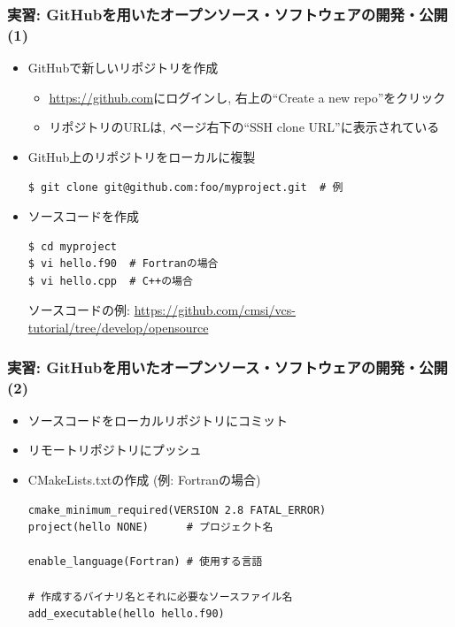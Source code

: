 \begin{frame}[t,fragile]
  \frametitle{実習: GitHubを用いたオープンソース・ソフトウェアの開発・公開(1)}
  \begin{itemize}
  \item GitHubで新しいリポジトリを作成
    \begin{itemize}
      \item \url{https://github.com}にログインし, 右上の``Create a new repo''をクリック
      \item リポジトリのURLは, ページ右下の``SSH clone URL''に表示されている
    \end{itemize}
  \item GitHub上のリポジトリをローカルに複製
\begin{lstlisting}
$ git clone git@github.com:foo/myproject.git  # 例
\end{lstlisting}
  \item ソースコードを作成
\begin{lstlisting}
$ cd myproject
$ vi hello.f90  # Fortranの場合
$ vi hello.cpp  # C++の場合
\end{lstlisting}
  ソースコードの例: \url{https://github.com/cmsi/vcs-tutorial/tree/develop/opensource}
  \end{itemize}
\end{frame}

\begin{frame}[t,fragile]
  \frametitle{実習: GitHubを用いたオープンソース・ソフトウェアの開発・公開(2)}
  \begin{itemize}
  \item ソースコードをローカルリポジトリにコミット
  \item リモートリポジトリにプッシュ
  \item CMakeLists.txtの作成 (例: Fortranの場合)
\begin{lstlisting}
cmake_minimum_required(VERSION 2.8 FATAL_ERROR)
project(hello NONE)      # プロジェクト名

enable_language(Fortran) # 使用する言語

# 作成するバイナリ名とそれに必要なソースファイル名
add_executable(hello hello.f90)
\end{lstlisting}
  \end{itemize}
\end{frame}


